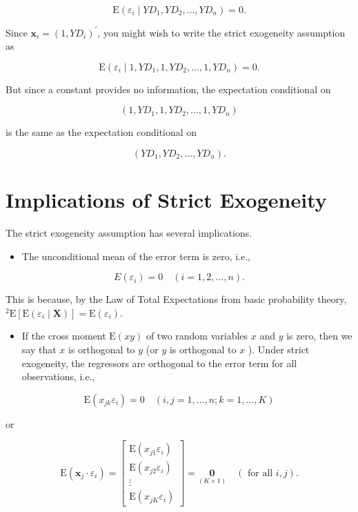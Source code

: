 \documentclass[10pt]{article}
\begin{document}
$$
\mathrm{E}\left(\varepsilon_{i} \mid Y D_{1}, Y D_{2}, \ldots, Y D_{n}\right)=0 .
$$

Since $\mathbf{x}_{i}=\left(1, Y D_{i}\right)^{\prime}$, you might wish to write the strict exogeneity assumption as

$$
\mathrm{E}\left(\varepsilon_{i} \mid 1, Y D_{1}, 1, Y D_{2}, \ldots, 1, Y D_{n}\right)=0 .
$$

But since a constant provides no information, the expectation conditional on

$$
\left(1, Y D_{1}, 1, Y D_{2}, \ldots, 1, Y D_{n}\right)
$$

is the same as the expectation conditional on

$$
\left(Y D_{1}, Y D_{2}, \ldots, Y D_{n}\right) .
$$

\section*{Implications of Strict Exogeneity}
The strict exogeneity assumption has several implications.

\begin{itemize}
  \item The unconditional mean of the error term is zero, i.e.,
\end{itemize}


\begin{equation*}
E\left(\varepsilon_{i}\right)=0 \quad(i=1,2, \ldots, n) . \tag{1.1.8}
\end{equation*}


This is because, by the Law of Total Expectations from basic probability theory, ${ }^{2} \mathrm{E}\left[\mathrm{E}\left(\varepsilon_{i} \mid \mathbf{X}\right)\right]=\mathrm{E}\left(\varepsilon_{i}\right)$.

\begin{itemize}
  \item If the cross moment $\mathrm{E}(x y)$ of two random variables $x$ and $y$ is zero, then we say that $x$ is orthogonal to $y$ (or $y$ is orthogonal to $x$ ). Under strict exogeneity, the regressors are orthogonal to the error term for all observations, i.e.,
\end{itemize}

$$
\mathrm{E}\left(x_{j k} \varepsilon_{i}\right)=0 \quad(i, j=1, \ldots, n ; k=1, \ldots, K)
$$

or

\[
\mathrm{E}\left(\mathbf{x}_{j} \cdot \varepsilon_{i}\right)=\left[\begin{array}{c}
\mathrm{E}\left(x_{j 1} \varepsilon_{i}\right)  \tag{1.1.9}\\
\mathrm{E}\left(x_{j 2} \varepsilon_{i}\right) \\
\vdots \\
\mathrm{E}\left(x_{j K} \varepsilon_{i}\right)
\end{array}\right]=\underset{(K \times 1)}{\mathbf{0}} \quad(\text { for all } i, j) .
\]
\end{document}
